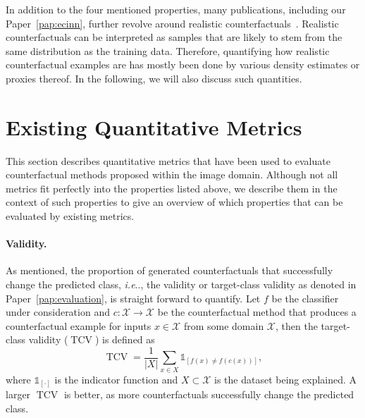 \documentclass[11pt,a4paper,twoside,openright,final]{memoir}
\makeatletter
\DeclareRobustCommand\onedot{\futurelet\@let@token\@onedot}
\def\@onedot{\ifx\@let@token.\else.\null\fi\xspace}
\def\ie{\emph{i.e}\onedot} \def\Ie{\emph{I.e}\onedot}
\newcommand*{\paperref}[1]{Paper~\hyperref[#1]{\ref{#1}}}
\makeatother
\begin{document}
In addition to the four mentioned properties, many publications, including our \paperref{pap:ecinn}, further revolve around realistic counterfactuals~\cite{Singla2019, flowcounterfactuals, Rodriguez2021, VanLooveren2019}. %
Realistic counterfactuals can be interpreted as samples that are likely to stem from the same distribution as the training data. 
Therefore, quantifying how realistic counterfactual examples are has mostly been done by various density estimates or proxies thereof.
In the following, we will also discuss such quantities. 

\section{Existing Quantitative Metrics}\label{sec:existing-metrics}

This section describes quantitative metrics that have been used to evaluate counterfactual methods proposed within the image domain.
Although not all metrics fit perfectly into the properties listed above, we describe them in the context of such properties to give an overview of which properties that can be evaluated by existing metrics.

\paragraph{Validity.}
As mentioned, the proportion of generated counterfactuals that successfully change the predicted class, \ie, the validity or target-class validity as denoted in \paperref{pap:evaluation}, is straight forward to quantify.
Let $f$ be the classifier under consideration and $c: \mathcal{X} \rightarrow \mathcal{X}$ be the counterfactual method that produces a counterfactual example for inputs $x\in \mathcal{X}$ from some domain $\mathcal{X}$, then the target-class validity ($\operatorname{TCV}$) is defined as
\begin{equation}\label{eq:tcv}
    \operatorname{TCV} = \frac{1}{|X|} \sum_{x \in X} \mathbb{1}_{[ f(x) \neq f( c(x) )]}, 
\end{equation}
where $\mathbb{1}_{[\cdot]}$ is the indicator function and $X \subset \mathcal{X}$ is the dataset being explained.
A larger $\operatorname{TCV}$ is better, as more counterfactuals successfully change the predicted class.
\end{document}
